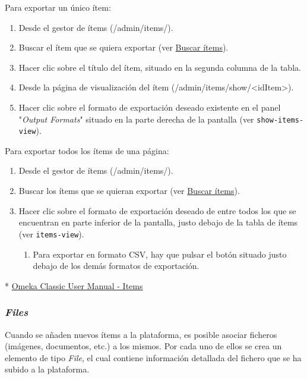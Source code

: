 \documentclass[
]{article}
\providecommand{\tightlist}{%
  \setlength{\itemsep}{0pt}\setlength{\parskip}{0pt}}
\begin{document}
Para exportar un único ítem:

\begin{enumerate}
\def\labelenumi{\arabic{enumi}.}
\tightlist
\item
  Desde el gestor de ítems ({/admin/items/}).
\item
  Buscar el ítem que se quiera exportar (ver
  \protect\hyperlink{buscar-uxedtems}{Buscar ítems}).
\item
  Hacer clic sobre el título del ítem, situado en la segunda columna de
  la tabla.
\item
  Desde la página de visualización del ítem
  ({/admin/items/show/\textless idItem\textgreater{}}).
\item
  Hacer clic sobre el formato de exportación deseado existente en el
  panel "\emph{Output Formats}" situado en la parte derecha de la
  pantalla (ver \texttt{show-items-view}).
\end{enumerate}

Para exportar todos los ítems de una página:

\begin{enumerate}
\def\labelenumi{\arabic{enumi}.}
\tightlist
\item
  Desde el gestor de ítems ({/admin/items/}).
\item
  Buscar los ítems que se quieran exportar (ver
  \protect\hyperlink{buscar-uxedtems}{Buscar ítems}).
\item
  Hacer clic sobre el formato de exportación deseado de entre todos los
  que se encuentran en parte inferior de la pantalla, justo debajo de la
  tabla de ítems (ver \texttt{items-view}).

  \begin{enumerate}
  \def\labelenumii{\alph{enumii}.}
  \tightlist
  \item
    Para exportar en formato CSV, hay que pulsar el botón situado justo
    debajo de los demás formatos de exportación.
  \end{enumerate}
\end{enumerate}

* \href{https://omeka.org/classic/docs/Content/Items/}{Omeka Classic
User Manual - Items}

\hypertarget{files}{%
\subsubsection{\texorpdfstring{\emph{Files}}{Files}}\label{files}}

Cuando se añaden nuevos ítems a la plataforma, es posible asociar
ficheros (imágenes, documentos, etc.) a los mismos. Por cada uno de
ellos se crea un elemento de tipo \emph{File}, el cual contiene
información detallada del fichero que se ha subido a la plataforma.
\end{document}
